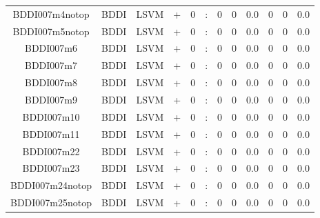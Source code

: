 \documentclass[a4paper]{article}
\begin{document}
\begin{landscape}
\begin{center}
\begin{tabular}{ |c|c|c|c|c|c|c|c|c|c|c|c|}
 
 	
 	\small{ BDDI007m4notop } & BDDI & LSVM & +  &  0 &  :  &  0 & 0 & 0.0  &  0 & 0 & 0.0 \\
 	

 
 	
 	\small{ BDDI007m5notop } & BDDI & LSVM & +  &  0 &  :  &  0 & 0 & 0.0  &  0 & 0 & 0.0 \\
 	

 
 	
 	\small{ BDDI007m6 } & BDDI & LSVM & +  &  0 &  :  &  0 & 0 & 0.0  &  0 & 0 & 0.0 \\
 	

 
 	
 	\small{ BDDI007m7 } & BDDI & LSVM & +  &  0 &  :  &  0 & 0 & 0.0  &  0 & 0 & 0.0 \\
 	

 
 	
 	\small{ BDDI007m8 } & BDDI & LSVM & +  &  0 &  :  &  0 & 0 & 0.0  &  0 & 0 & 0.0 \\
 	

 
 	
 	\small{ BDDI007m9 } & BDDI & LSVM & +  &  0 &  :  &  0 & 0 & 0.0  &  0 & 0 & 0.0 \\
 	

 
 	
 	\small{ BDDI007m10 } & BDDI & LSVM & +  &  0 &  :  &  0 & 0 & 0.0  &  0 & 0 & 0.0 \\
 	

 
 	
 	\small{ BDDI007m11 } & BDDI & LSVM & +  &  0 &  :  &  0 & 0 & 0.0  &  0 & 0 & 0.0 \\
 	

 
 	
 	\small{ BDDI007m22 } & BDDI & LSVM & +  &  0 &  :  &  0 & 0 & 0.0  &  0 & 0 & 0.0 \\
 	

 
 	
 	\small{ BDDI007m23 } & BDDI & LSVM & +  &  0 &  :  &  0 & 0 & 0.0  &  0 & 0 & 0.0 \\
 	

 
 	
 	\small{ BDDI007m24notop } & BDDI & LSVM & +  &  0 &  :  &  0 & 0 & 0.0  &  0 & 0 & 0.0 \\
 	

 
 	
 	\small{ BDDI007m25notop } & BDDI & LSVM & +  &  0 &  :  &  0 & 0 & 0.0  &  0 & 0 & 0.0 \\
 	


\end{tabular}
\end{center}
\end{landscape}
\end{document}
